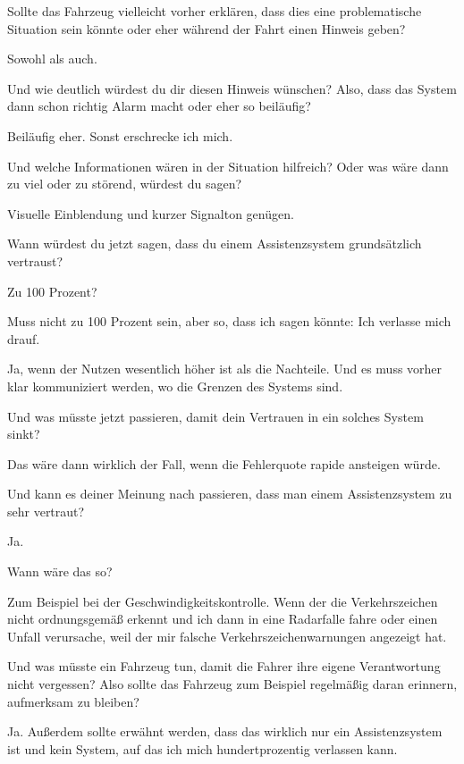 \interviewerin
Sollte das Fahrzeug vielleicht vorher erklären, dass dies eine
problematische Situation sein könnte oder eher während der Fahrt einen
Hinweis geben?

Sowohl als auch.

\interviewerin
Und wie deutlich würdest du dir diesen Hinweis wünschen? Also, dass das
System dann schon richtig Alarm macht oder eher so beiläufig?

Beiläufig eher. Sonst erschrecke ich mich.

\interviewerin
Und welche Informationen wären in der Situation hilfreich? Oder was
wäre dann zu viel oder zu störend, würdest du sagen?

Visuelle Einblendung und kurzer Signalton genügen.

\interviewerin
Wann würdest du jetzt sagen, dass du einem Assistenzsystem grundsätzlich
vertraust?

Zu 100 Prozent?

\interviewerin
Muss nicht zu 100 Prozent sein, aber so, dass ich sagen könnte: Ich
verlasse mich drauf.

Ja, wenn der Nutzen wesentlich höher ist als die Nachteile. Und es muss
vorher klar kommuniziert werden, wo die Grenzen des Systems sind.

\interviewerin
Und was müsste jetzt passieren, damit dein Vertrauen in ein solches
System sinkt?

Das wäre dann wirklich der Fall, wenn die Fehlerquote rapide ansteigen
würde.

\interviewerin
Und kann es deiner Meinung nach passieren, dass man einem
Assistenzsystem zu sehr vertraut?

Ja.

\interviewerin
Wann wäre das so?

Zum Beispiel bei der Geschwindigkeitskontrolle. Wenn der die
Verkehrszeichen nicht ordnungsgemäß erkennt und ich dann in eine
Radarfalle fahre oder einen Unfall verursache, weil der mir falsche
Verkehrszeichenwarnungen angezeigt hat.

\interviewerin
Und was müsste ein Fahrzeug tun, damit die Fahrer ihre eigene
Verantwortung nicht vergessen? Also sollte das Fahrzeug zum Beispiel
regelmäßig daran erinnern, aufmerksam zu bleiben?

Ja. Außerdem sollte erwähnt werden, dass das wirklich nur ein
Assistenzsystem ist und kein System, auf das ich mich hundertprozentig
verlassen kann.

